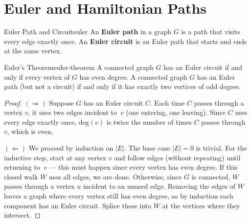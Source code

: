 \documentclass[11pt,a4paper]{scrartcl}
\renewcommand{\deg}{\mathrm{deg}}        %
\begin{document}
\section{Euler and Hamiltonian Paths}

\begin{definition}{Euler Path and Circuit}{euler}
An \textbf{Euler path} in a graph $G$ is a path that visits every edge exactly once. An \textbf{Euler circuit} is an Euler path that starts and ends at the same vertex.
\end{definition}

\begin{theorem}{Euler's Theorem}{euler-theorem}
A connected graph $G$ has an Euler circuit if and only if every vertex of $G$ has even degree. A connected graph $G$ has an Euler path (but not a circuit) if and only if it has exactly two vertices of odd degree.
\end{theorem}

\begin{proof}
$(\Rightarrow)$ Suppose $G$ has an Euler circuit $C$. Each time $C$ passes through a vertex $v$, it uses two edges incident to~$v$ (one entering, one leaving). Since $C$ uses every edge exactly once, $\deg(v)$ is twice the number of times $C$ passes through~$v$, which is even.

$(\Leftarrow)$ We proceed by induction on $|E|$. The base case $|E| = 0$ is trivial. For the inductive step, start at any vertex $v$ and follow edges (without repeating) until returning to~$v$ --- this must happen since every vertex has even degree. If this closed walk $W$ uses all edges, we are done. Otherwise, since $G$ is connected, $W$ passes through a vertex $u$ incident to an unused edge. Removing the edges of $W$ leaves a graph where every vertex still has even degree, so by induction each component has an Euler circuit. Splice these into $W$ at the vertices where they intersect.
\end{proof}
\end{document}

